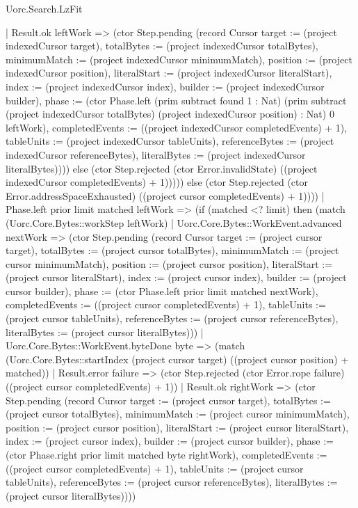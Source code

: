 \begin{lexlean}{Uorc.Search.LzFit}
\begin{semanticmodule}
{      | Result.ok leftWork => (ctor Step.pending (record Cursor {target := (project indexedCursor target), totalBytes := (project indexedCursor totalBytes), minimumMatch := (project indexedCursor minimumMatch), position := (project indexedCursor position), literalStart := (project indexedCursor literalStart), index := (project indexedCursor index), builder := (project indexedCursor builder), phase := (ctor Phase.left (prim subtract found 1 : Nat) (prim subtract (project indexedCursor totalBytes) (project indexedCursor position) : Nat) 0 leftWork), completedEvents := ((project indexedCursor completedEvents) + 1), tableUnits := (project indexedCursor tableUnits), referenceBytes := (project indexedCursor referenceBytes), literalBytes := (project indexedCursor literalBytes)}))) else (ctor Step.rejected (ctor Error.invalidState) ((project indexedCursor completedEvents) + 1))))) else (ctor Step.rejected (ctor Error.addressSpaceExhausted) ((project cursor completedEvents) + 1))))
    | Phase.left prior limit matched leftWork => (if (matched <? limit) then (match (Uorc.Core.Bytes::workStep leftWork)
      | Uorc.Core.Bytes::WorkEvent.advanced nextWork => (ctor Step.pending (record Cursor {target := (project cursor target), totalBytes := (project cursor totalBytes), minimumMatch := (project cursor minimumMatch), position := (project cursor position), literalStart := (project cursor literalStart), index := (project cursor index), builder := (project cursor builder), phase := (ctor Phase.left prior limit matched nextWork), completedEvents := ((project cursor completedEvents) + 1), tableUnits := (project cursor tableUnits), referenceBytes := (project cursor referenceBytes), literalBytes := (project cursor literalBytes)}))
      | Uorc.Core.Bytes::WorkEvent.byteDone byte => (match (Uorc.Core.Bytes::startIndex (project cursor target) ((project cursor position) + matched))
        | Result.error failure => (ctor Step.rejected (ctor Error.rope failure) ((project cursor completedEvents) + 1))
        | Result.ok rightWork => (ctor Step.pending (record Cursor {target := (project cursor target), totalBytes := (project cursor totalBytes), minimumMatch := (project cursor minimumMatch), position := (project cursor position), literalStart := (project cursor literalStart), index := (project cursor index), builder := (project cursor builder), phase := (ctor Phase.right prior limit matched byte rightWork), completedEvents := ((project cursor completedEvents) + 1), tableUnits := (project cursor tableUnits), referenceBytes := (project cursor referenceBytes), literalBytes := (project cursor literalBytes)})))
}
\end{semanticmodule}
\end{lexlean}
